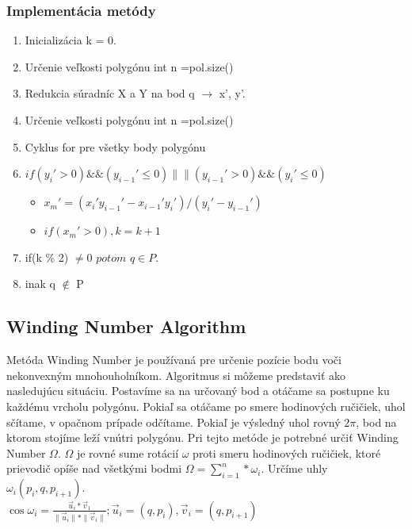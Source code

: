 \documentclass[12pt]{article}
\begin{document}
\subsubsection {Implementácia metódy}
\begin{enumerate}
\item Inicializácia k = 0.
\item Určenie veľkosti polygónu int n =pol.size()
\item Redukcia súradníc X a Y na bod q $\to$ x', y'.
\item Určenie veľkosti polygónu int n =pol.size()
\item Cyklus for pre všetky body polygónu
\item $if(y_i' >0) \&\& (y_{i-1}' \leq 0) \|\| (y_{i-1}' > 0) \&\& (y_i' \leq 0)$

\begin{itemize}
\item $x_m'=(x_i'y_{i-1}'-x_{i-1}'y_i')/(y_i'-y_{i-1}')$
\item $if(x_m'>0), k = k+1$
\end{itemize}

\item if(k \% 2) $\neq 0$ $potom$ $q \in P$.
\item inak q $\notin$ P
\end{enumerate}

\subsection {Winding Number Algorithm}

Metóda Winding Number je používaná pre určenie pozície bodu voči nekonvexným mnohouholníkom. Algoritmus si môžeme predstaviť ako nasledujúcu situáciu. Postavíme sa na určovaný bod a otáčame sa postupne ku každému vrcholu polygónu. Pokiaľ sa otáčame po smere hodinových ručičiek, uhol sčítame, v opačnom prípade odčítame. Pokiaľ je výsledný uhol rovný 2$\pi$, bod na ktorom stojíme leží vnútri polygónu. Pri tejto metóde je potrebné určiť Winding Number $\Omega$. $\Omega$ je rovné sume rotácií $\omega$ proti smeru hodinových ručičiek, ktoré prievodič opíše nad všetkými bodmi $\Omega = \sum_{i=1}^{n}*\omega_i$. Určíme uhly $\omega_i(p_i,q,p_{i+1})$. \\[2pt]

$\cos \omega_i = \frac{\vec u_i *\vec v_1}{\parallel \vec u_i \parallel*\parallel \vec v_i \parallel}; \vec u_i = (q, p_i), \vec v_i = (q, p_{i+1})$ \\[2pt]
\end{document}
